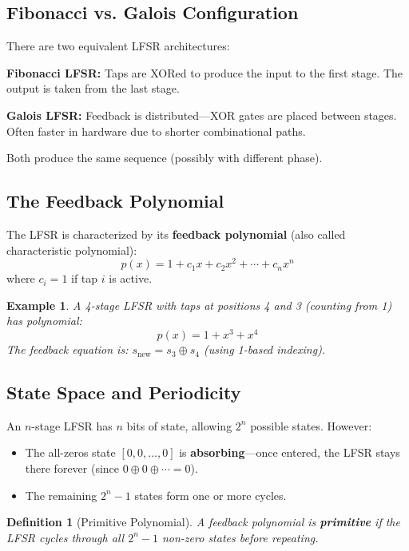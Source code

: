 \documentclass[11pt]{article}
\newtheorem{definition}{Definition}
\newtheorem{example}{Example}
\begin{document}
\subsection{Fibonacci vs. Galois Configuration}

There are two equivalent LFSR architectures:

\textbf{Fibonacci LFSR:} Taps are XORed to produce the input to the first stage. The output is taken from the last stage.

\textbf{Galois LFSR:} Feedback is distributed---XOR gates are placed between stages. Often faster in hardware due to shorter combinational paths.

Both produce the same sequence (possibly with different phase).

\subsection{The Feedback Polynomial}

The LFSR is characterized by its \textbf{feedback polynomial} (also called characteristic polynomial):
\begin{equation}
p(x) = 1 + c_1 x + c_2 x^2 + \cdots + c_n x^n
\end{equation}
where $c_i = 1$ if tap $i$ is active.

\begin{example}
A 4-stage LFSR with taps at positions 4 and 3 (counting from 1) has polynomial:
\begin{equation}
p(x) = 1 + x^3 + x^4
\end{equation}
The feedback equation is: $s_{\text{new}} = s_3 \oplus s_4$ (using 1-based indexing).
\end{example}

\subsection{State Space and Periodicity}

An $n$-stage LFSR has $n$ bits of state, allowing $2^n$ possible states. However:
\begin{itemize}
    \item The all-zeros state $[0,0,\ldots,0]$ is \textbf{absorbing}---once entered, the LFSR stays there forever (since $0 \oplus 0 \oplus \cdots = 0$).
    \item The remaining $2^n - 1$ states form one or more cycles.
\end{itemize}

\begin{definition}[Primitive Polynomial]
A feedback polynomial is \textbf{primitive} if the LFSR cycles through all $2^n - 1$ non-zero states before repeating.
\end{definition}
\end{document}
